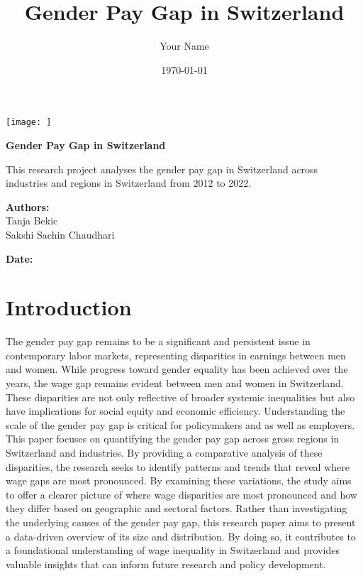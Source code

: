 \documentclass{article}
\author{Your Name}
\date{\today}
\begin{document}
\title{\textbf{Gender Pay Gap in Switzerland}}


\begin{titlepage}
    \centering
    \vspace*{-1.5cm} %
    \texttt{[image:   ]} %
    
    \vspace{2cm}
    \Huge
    \textbf{Gender Pay Gap in Switzerland}
    
    \vspace{1cm}
    \LARGE
    This research project analyses the gender pay gap in Switzerland across industries and regions in Switzerland from 2012 to 2022. 
    
    \vspace{1cm}
    \textbf{Authors:}\\ Tanja Bekic \\  Sakshi Sachin Chaudhari
    \vspace{1cm}
    
    \textbf{Date:}\\
    \thedate
    \vfill
    
\end{titlepage}



\section{Introduction}
The gender pay gap remains to be a significant and persistent issue in contemporary labor markets, representing disparities in earnings between men and women. While progress toward gender equality has been achieved over the years, the wage gap remains evident between men and women in Switzerland. These disparities are not only reflective of broader systemic inequalities but also have implications for social equity and economic efficiency. Understanding the scale of the gender pay gap is critical for policymakers and as well as employers. 
This paper focuses on quantifying the gender pay gap across gross regions in Switzerland and industries. By providing a comparative analysis of these disparities, the research seeks to identify patterns and trends that reveal where wage gaps are most pronounced. By examining these variations, the study aims to offer a clearer picture of where wage disparities are most pronounced and how they differ based on geographic and sectoral factors. 
Rather than investigating the underlying causes of the gender pay gap, this research paper aims to present a data-driven overview of its size and distribution. By doing so, it contributes to a foundational understanding of wage inequality in Switzerland and provides valuable insights that can inform future research and policy development.
\end{document}
